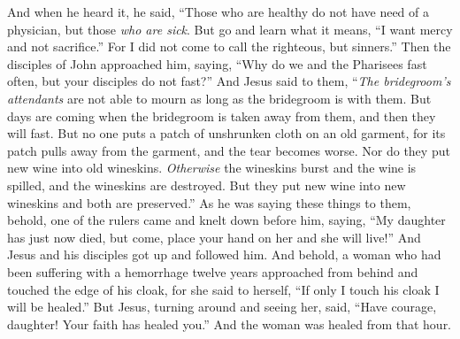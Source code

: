 \begin{biblechapter}
\verse And when he heard it, he said, “Those who are healthy do not have need of a physician, but those \textit{who are sick}.
\verse But go and learn what it means, “I want mercy and not sacrifice.” For I did not come to call the righteous, but sinners.”
 Then the disciples of John approached him, saying, “Why do we and the Pharisees fast often, but your disciples do not fast?”
\verse And Jesus said to them, “\textit{The bridegroom’s attendants} are not able to mourn as long as the bridegroom is with them. But days are coming when the bridegroom is taken away from them, and then they will fast.
\verse But no one puts a patch of unshrunken cloth on an old garment, for its patch pulls away from the garment, and the tear becomes worse.
\verse Nor do they put new wine into old wineskins. \textit{Otherwise} the wineskins burst and the wine is spilled, and the wineskins are destroyed. But they put new wine into new wineskins and both are preserved.”
 As he was saying these things to them, behold, one of the rulers came and knelt down before him, saying, “My daughter has just now died, but come, place your hand on her and she will live!”
\verse And Jesus and his disciples got up and followed him.
\verse And behold, a woman who had been suffering with a hemorrhage twelve years approached from behind and touched the edge of his cloak,
\verse for she said to herself, “If only I touch his cloak I will be healed.”
\verse But Jesus, turning around and seeing her, said, “Have courage, daughter! Your faith has healed you.” And the woman was healed from that hour.

\end{biblechapter}
